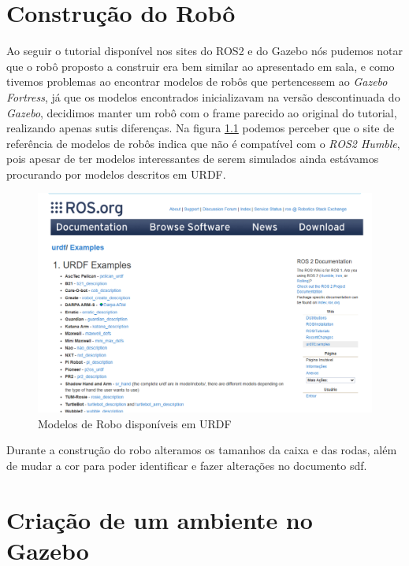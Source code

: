 \gdef\clearforchapter{}

\chapter{Construção do Robô}\label{chapter:construcao}

Ao seguir o tutorial disponível nos sites do ROS2 e do Gazebo nós pudemos notar que o robô proposto a construir era bem similar ao apresentado em sala, e como tivemos problemas ao encontrar modelos de robôs que pertencessem ao \textit{Gazebo Fortress}, já que os modelos encontrados inicializavam na versão descontinuada do \textit{Gazebo}, decidimos manter um robô com o frame parecido ao original do tutorial, realizando apenas sutis diferenças. Na figura \ref{fig:URDF} podemos perceber que o site de referência de modelos de robôs indica que não é compatível com o \textit{ROS2 Humble}, pois apesar de ter modelos interessantes de serem simulados ainda estávamos procurando por modelos descritos em URDF.

\begin{figure}[h]
    \centering
    \includegraphics[width=0.5\linewidth]{Figuras/URDF.png}
    \caption{Modelos de Robo disponíveis em URDF}
    \label{fig:URDF}
\end{figure}

Durante a construção do robo alteramos os tamanhos da caixa e das rodas, além de mudar a cor para poder identificar e fazer alterações no documento sdf.







\vspace{0.5cm}
\chapter{Criação de um ambiente no Gazebo}\label{chapter: criacao}

